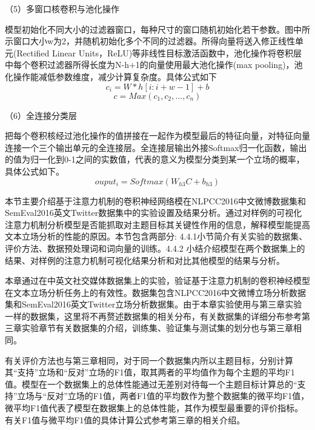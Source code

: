 （5）多窗口核卷积与池化操作

模型初始化不同大小的过滤器窗口，每种尺寸的窗口随机初始化若干参数。图中所示窗口大小w为2，并随机初始化多个不同的过滤器。所得向量将送入修正线性单元(Rectified Linear Units，ReLU)等非线性目标激活函数中，池化操作将卷积层中每个卷积过滤器所得长度为N-h+1的向量使用最大池化操作(max pooling)，池化操作能减低参数维度，减少计算复杂度。具体公式如下
\begin{equation}\label{conv1} c_i=W*h[i:i+w-1]+b \end{equation}
\begin{equation}\label{conv1} c=Max(c_1,c_2,...,c_n) \end{equation}

（6）全连接分类层

把每个卷积核经过池化操作的值拼接在一起作为模型最后的特征向量，对特征向量连接一个三个输出单元的全连接层。全连接层输出外接Softmax归一化函数，输出的值为归一化到0-1之间的实数值，代表的意义为模型分类到某一个立场的概率，具体公式如下。
\begin{equation}\label{conv1} ouput_i=Softmax(W_{h3}C+b_{h3}) \end{equation}




本节主要介绍基于注意力机制的卷积神经网络模在NLPCC2016中文微博数据集和SemEval2016英文Twitter数据集中的实验设置及结果分析。通过对样例的可视化注意力机制分析模型是否能抓取对主题目标其关键性作用的信息，解释模型能提高文本立场分析的性能的原因。本节包含两部分: 4.4.1小节简介有关实验的数据集、评价方法、数据预处理词和词向量的训练。4.4.2 小结介绍模型在两个数据集上的结果、对样例的注意力机制可视化结果分析和对比其他模型的结果与分析。



本章通过在中英文社交媒体数据集上的实验，验证基于注意力机制的卷积神经模型在文本立场分析任务上的有效性。数据集包含NLPCC2016中文微博立场分析数据集和SemEval2016英文Twitter立场分析数据集。由于本章实验使用与第三章实验一样的数据集，这里将不再赘述数据集的相关分布，有关数据集的详细分布参考第三章实验章节有关数据集的介绍，训练集、验证集与测试集的划分也与第三章相同。

有关评价方法也与第三章相同，对于同一个数据集内所以主题目标，分别计算其“支持”立场和“反对”立场的F1值，取其两者的平均值作为每个主题的平均F1值。模型在一个数据集上的总体性能通过无差别对待每一个主题目标计算总的“支持”立场与“反对”立场的F1值，两者F1值的平均数作为整个数据集的微平均F1值，微平均F1值代表了模型在数据集上的总体性能，其作为模型最重要的评价指标。有关F1值与微平均F1值的具体计算公式参考第三章的相关介绍。

